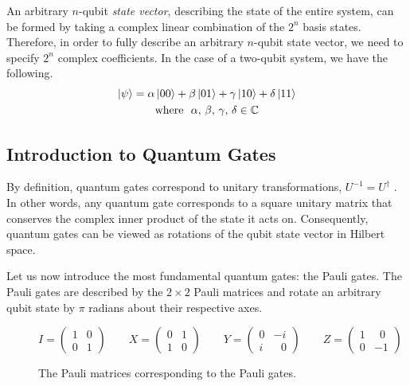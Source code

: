 An arbitrary $n$-qubit \textit{state vector}, describing the state of the entire system, can be formed by taking a complex linear combination of the $2^n$ basis states. Therefore, in order to fully describe an arbitrary $n$-qubit state vector, we need to specify $2^n$ complex coefficients. In the case of a two-qubit system, we have the following.
\begin{gather*}
    \ket\psi =
    \alpha \ket{00} +
    \beta \ket{01} +
    \gamma \ket{10} +
    \delta \ket{11} \\
    \text{where} \,\,\,\, \alpha, \, \beta, \, \gamma, \, \delta \in \mathbb{C}
\end{gather*}

\newpage
\subsection{Introduction to Quantum Gates}%
\label{quantum-gates}

By definition, quantum gates correspond to unitary transformations, $U^{-1} = U^\dagger$ \cite{Nielsen2012}. In other words, any quantum gate corresponds to a square unitary matrix that conserves the complex inner product of the state it acts on. Consequently, quantum gates can be viewed as rotations of the qubit state vector in Hilbert space.

Let us now introduce the most fundamental quantum gates: the Pauli gates. The Pauli gates are described by the $2 \times 2$ Pauli matrices and rotate an arbitrary qubit state by $\pi$ radians about their respective axes.

\begin{figure}[H]
    \centering
    \begin{equation*}
        I = \begin{pmatrix} 1 & 0 \\ 0 & 1\end{pmatrix} \qquad
        X = \begin{pmatrix} 0 & 1 \\ 1 & 0\end{pmatrix} \qquad
        Y = \begin{pmatrix} 0 & -i \\ i & \,\,\,\,0\end{pmatrix} \qquad
        Z = \begin{pmatrix} 1 & \,\,\,0 \\ 0 & -1\end{pmatrix}
    \end{equation*}
    \caption{The Pauli matrices corresponding to the Pauli gates.}
    \label{pauli-matrices}
\end{figure}

